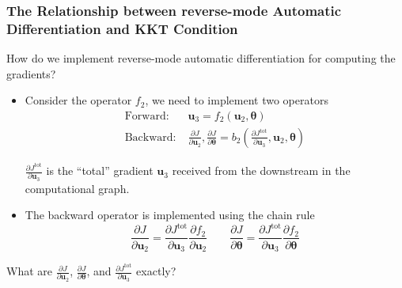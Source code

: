 \documentclass[usenames,dvipsnames]{beamer}
\newcommand{\bt}[0]{\bm{\theta}}
\newcommand{\bu}{\mathbf{u}}
\begin{document}
\begin{frame}
\frametitle{The  Relationship between reverse-mode Automatic Differentiation and KKT Condition}
How do we implement reverse-mode automatic differentiation for computing the gradients? 
\begin{itemize}
	\item Consider the operator $f_2$, we need to implement two operators 
	\begin{align*}
		\mbox{Forward:}&\; \bu_3 = f_2(\bu_2, \bt)\\
		\mbox{Backward:}&\; \frac{\partial J}{\partial \bu_2}, \frac{\partial J}{\partial \bt} = b_2\left(\frac{\partial J^{\mathrm{tot}}}{\partial \bu_3}, \bu_2, \bt\right)
	\end{align*}
	
	$\frac{\partial J^{\mathrm{tot}}}{\partial \bu_3}$ is the ``total'' gradient $\bu_3$ received from the downstream in the computational graph. 
	
\item The backward operator is implemented using the chain rule
\begin{equation*}
	\frac{\partial J}{\partial \bu_2} = \frac{\partial J^{\mathrm{tot}}}{\partial \bu_3} \frac{\partial f_2}{\partial \bu_2}\qquad
	\frac{\partial J}{\partial \bt} = \frac{\partial J^{\mathrm{tot}}}{\partial \bu_3} \frac{\partial f_2}{\partial \bt}
\end{equation*}

	
\end{itemize}

What are $\frac{\partial J}{\partial \bu_2}$, $\frac{\partial J}{\partial \bt}$, and $\frac{\partial J^{\mathrm{tot}}}{\partial \bu_3}$ exactly?

	
\end{frame}
\end{document}
